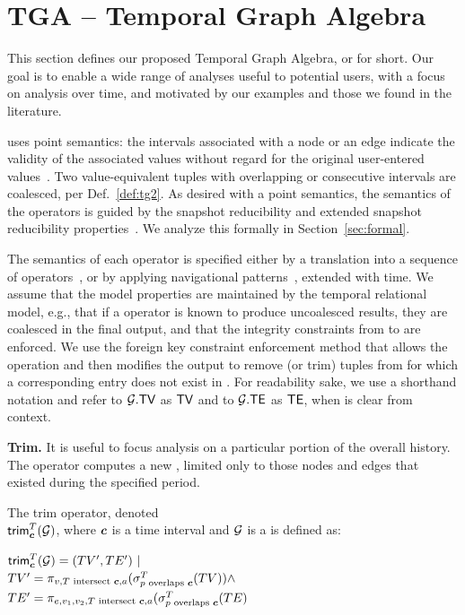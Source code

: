 \section{TGA -- Temporal Graph Algebra}
\label{sec:algebra}

This section defines our proposed Temporal Graph Algebra, or \tga for
short.  Our goal is to enable a wide range of analyses useful to
potential users, with a focus on analysis over time, and motivated by
our examples and those we found in the literature.

\tga uses point semantics: the intervals associated with a node or an
edge indicate the validity of the associated values without regard for
the original user-entered values~\cite{DBLP:reference/db/JensenS09k}.
Two value-equivalent tuples with overlapping or consecutive intervals
are coalesced, per Def.~\ref{def:tg2}.  As desired with a point
semantics, the semantics of the \tga operators is guided by the
snapshot reducibility and extended snapshot reducibility
properties~\cite{Dignos2012}.  We analyze this formally in
Section~\ref{sec:formal}.

The semantics of each operator is specified either by a translation
into a sequence of \tra operators~\cite{Dignos2012}, or by applying
navigational patterns~\cite{DBLP:journals/corr/AnglesABHRV16},
extended with time.  We assume that the model properties are
maintained by the temporal relational model, e.g., that if a \tra
operator is known to produce uncoalesced results, they are coalesced
in the final output, and that the integrity constraints from \te to
\tv are enforced.  We use the foreign key constraint enforcement
method that allows the operation and then modifies the output to
remove (or trim) tuples from \te for which a corresponding entry does
not exist in \tv.  For readability sake, we use a shorthand notation
and refer to $\mathcal{G}.\textsf{TV}$ as $\textsf{TV}$ and to $\mathcal{G}.\textsf{TE}$ as $\textsf{TE}$, when \tve
is clear from context.

{\bf Trim.}  It is useful to focus analysis on a particular portion of
the overall \tg history.  The  operator computes a new
\tg, limited only to those nodes and edges that existed during the
specified period.

\begin{definition}[Trim]
\label{def:slice}
The trim operator, denoted \\$\textsf{trim}^T_{\boldsymbol{c}}(\mathcal{G})$, where
$\boldsymbol{c}$ is a time interval and $\mathcal{G}$ is a \tg is defined as:

$\textsf{trim}^T_{\boldsymbol{c}}(\mathcal{G}) = (TV', TE') ~|~$\\ $TV' = \pi_{v,T \text{ intersect } \boldsymbol{c},a}(\sigma^T_{p \text{ overlaps } \boldsymbol{c}}(TV)) \land$ \\ $TE' = \pi_{e,v_1,v_2,T \text{ intersect } \boldsymbol{c},a}(\sigma^T_{p \text{ overlaps } \boldsymbol{c}}(TE)$
\end{definition}

